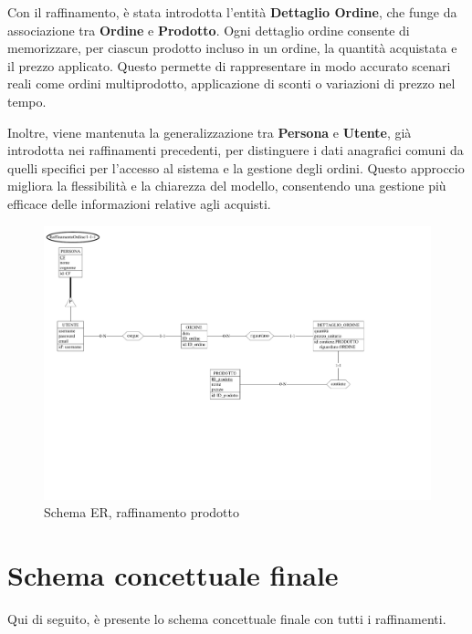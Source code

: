 \documentclass[a4paper,12pt]{report}
\begin{document}
\vspace{\baselineskip}
Con il raffinamento, è stata introdotta l'entità \textbf{Dettaglio Ordine}, che funge da associazione tra \textbf{Ordine}
e \textbf{Prodotto}. Ogni dettaglio ordine consente di memorizzare, per ciascun prodotto incluso in un ordine, la quantità
acquistata e il prezzo applicato. Questo permette di rappresentare in modo accurato scenari reali come ordini
multiprodotto, applicazione di sconti o variazioni di prezzo nel tempo.

\vspace{\baselineskip}
Inoltre, viene mantenuta la generalizzazione tra \textbf{Persona} e \textbf{Utente}, già introdotta nei raffinamenti
precedenti, per distinguere i dati anagrafici comuni da quelli specifici per l'accesso al sistema e la gestione degli
ordini. Questo approccio migliora la flessibilità e la chiarezza del modello, consentendo una gestione più efficace
delle informazioni relative agli acquisti.

\begin{figure}[H]
	\centering
	\includegraphics[width=\textwidth, trim=0 200pt 125pt 0, clip]{./pdf/raffinamento prodotto.pdf}
	\caption{Schema ER, raffinamento prodotto}
	\label{fig:raffinamento-prodotto}
\end{figure}

\newpage
\section{Schema concettuale finale}
Qui di seguito, è presente lo schema concettuale finale con tutti i raffinamenti.
\end{document}
